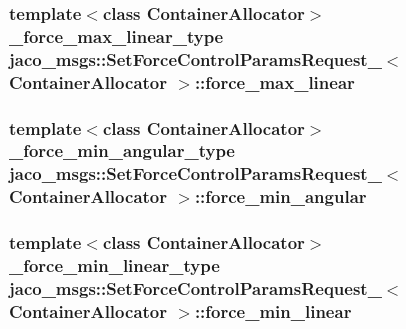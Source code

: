 \subsubsection[{\texorpdfstring{force\+\_\+max\+\_\+linear}{force_max_linear}}]{\setlength{\rightskip}{0pt plus 5cm}template$<$class Container\+Allocator$>$ {\bf \+\_\+force\+\_\+max\+\_\+linear\+\_\+type} {\bf jaco\+\_\+msgs\+::\+Set\+Force\+Control\+Params\+Request\+\_\+}$<$ Container\+Allocator $>$\+::force\+\_\+max\+\_\+linear}\hypertarget{structjaco__msgs_1_1SetForceControlParamsRequest___a89805bac05f838a5bc70a641539715f0}{}\label{structjaco__msgs_1_1SetForceControlParamsRequest___a89805bac05f838a5bc70a641539715f0}
\subsubsection[{\texorpdfstring{force\+\_\+min\+\_\+angular}{force_min_angular}}]{\setlength{\rightskip}{0pt plus 5cm}template$<$class Container\+Allocator$>$ {\bf \+\_\+force\+\_\+min\+\_\+angular\+\_\+type} {\bf jaco\+\_\+msgs\+::\+Set\+Force\+Control\+Params\+Request\+\_\+}$<$ Container\+Allocator $>$\+::force\+\_\+min\+\_\+angular}\hypertarget{structjaco__msgs_1_1SetForceControlParamsRequest___ab84d0d8b19f11eca2319c4ef903caafd}{}\label{structjaco__msgs_1_1SetForceControlParamsRequest___ab84d0d8b19f11eca2319c4ef903caafd}
\subsubsection[{\texorpdfstring{force\+\_\+min\+\_\+linear}{force_min_linear}}]{\setlength{\rightskip}{0pt plus 5cm}template$<$class Container\+Allocator$>$ {\bf \+\_\+force\+\_\+min\+\_\+linear\+\_\+type} {\bf jaco\+\_\+msgs\+::\+Set\+Force\+Control\+Params\+Request\+\_\+}$<$ Container\+Allocator $>$\+::force\+\_\+min\+\_\+linear}\hypertarget{structjaco__msgs_1_1SetForceControlParamsRequest___a6acec93f53a7132d740aa0335a05a36d}{}\label{structjaco__msgs_1_1SetForceControlParamsRequest___a6acec93f53a7132d740aa0335a05a36d}
